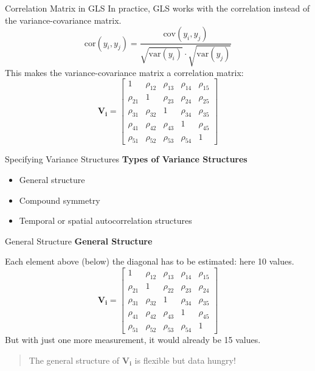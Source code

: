 \documentclass{beamer}
\begin{document}
\begin{frame}{Correlation Matrix in GLS}
  In practice, GLS works with the correlation instead of the variance-covariance matrix.
  \[
  \text{cor}(y_i,y_j) = \frac{\text{cov}(y_i, y_j)}{\sqrt{\text{var}(y_i)} \cdot \sqrt{\text{var}(y_j)}}
  \]
  This makes the variance-covariance matrix a correlation matrix:
  \[
  \mathbf{V_i} = 
  \begin{bmatrix}
  1 & \rho_{12} & \rho_{13} & \rho_{14} & \rho_{15} \\
  \rho_{21} & 1 & \rho_{23} & \rho_{24} & \rho_{25} \\
  \rho_{31} & \rho_{32} & 1 & \rho_{34} & \rho_{35} \\
  \rho_{41} & \rho_{42} & \rho_{43} & 1 & \rho_{45} \\
  \rho_{51} & \rho_{52} & \rho_{53} & \rho_{54} & 1
  \end{bmatrix}
  \]
\end{frame}

\begin{frame}{Specifying Variance Structures}
  \textbf{Types of Variance Structures}
  \begin{itemize}
    \item General structure
    \item Compound symmetry
    \item Temporal or spatial autocorrelation structures
  \end{itemize}
\end{frame}

\begin{frame}{General Structure}
  \textbf{General Structure}
  
  Each element above (below) the diagonal has to be estimated: here 10 values.
  \[
  \mathbf{V_i} = 
  \begin{bmatrix}
  1 & \rho_{12} & \rho_{13} & \rho_{14} & \rho_{15} \\
  \rho_{21} & 1 & \rho_{22} & \rho_{23} & \rho_{24} \\
  \rho_{31} & \rho_{32} & 1 & \rho_{34} & \rho_{35} \\
  \rho_{41} & \rho_{42} & \rho_{43} & 1 & \rho_{45} \\
  \rho_{51} & \rho_{52} & \rho_{53} & \rho_{54} & 1
  \end{bmatrix}
  \]
  But with just one more measurement, it would already be 15 values.
  \begin{quote}
    The general structure of $\mathbf{V_i}$ is flexible but data hungry!
  \end{quote}
\end{frame}
\end{document}
